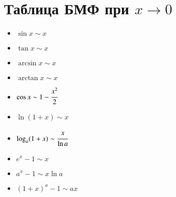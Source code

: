 \documentclass[twoside, a4paperpt]{extarticle}
\begin{document}
\section*{Таблица БМФ при $x \rightarrow 0$}
\begin{multicols}{2}
    \begin{itemize}
        \item $\sin x \sim x$
    
        \item $\tan x \sim x$
    
        \item $\arcsin x \sim x$
    
        \item $\arctan x \sim x$
    
        \item $\cos x \sim 1-\cfrac{x^{2}}{2}$
    
        \item $\ln (1+x) \sim x$
    
        \item $\log _{a}(1+x) \sim \cfrac{x}{\ln a}$
    
        \item $e^{x}-1 \sim x$
    
        \item $a^{x}-1 \sim x \ln a$
    
        \item  $(1+x)^{a}-1 \sim a x$
    \end{itemize}
\end{multicols}
\end{document}
